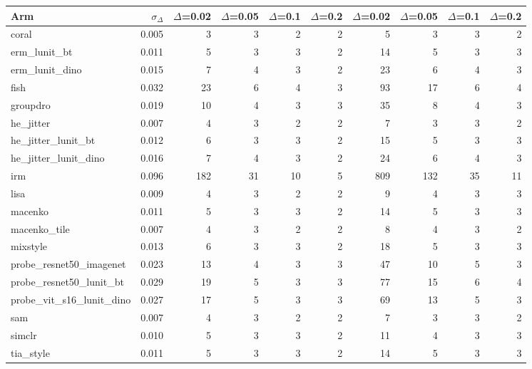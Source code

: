\begin{tabular}{lrrrrrrrrr}
\toprule
Arm & $\sigma_\Delta$ & $\Delta$=0.02 & $\Delta$=0.05 & $\Delta$=0.1 & $\Delta$=0.2 & $\Delta$=0.02 & $\Delta$=0.05 & $\Delta$=0.1 & $\Delta$=0.2 \\
\midrule
coral & 0.005 & 3 & 3 & 2 & 2 & 5 & 3 & 3 & 2 \\
erm\_lunit\_bt & 0.011 & 5 & 3 & 3 & 2 & 14 & 5 & 3 & 3 \\
erm\_lunit\_dino & 0.015 & 7 & 4 & 3 & 2 & 23 & 6 & 4 & 3 \\
fish & 0.032 & 23 & 6 & 4 & 3 & 93 & 17 & 6 & 4 \\
groupdro & 0.019 & 10 & 4 & 3 & 3 & 35 & 8 & 4 & 3 \\
he\_jitter & 0.007 & 4 & 3 & 2 & 2 & 7 & 3 & 3 & 2 \\
he\_jitter\_lunit\_bt & 0.012 & 6 & 3 & 3 & 2 & 15 & 5 & 3 & 3 \\
he\_jitter\_lunit\_dino & 0.016 & 7 & 4 & 3 & 2 & 24 & 6 & 4 & 3 \\
irm & 0.096 & 182 & 31 & 10 & 5 & 809 & 132 & 35 & 11 \\
lisa & 0.009 & 4 & 3 & 2 & 2 & 9 & 4 & 3 & 3 \\
macenko & 0.011 & 5 & 3 & 3 & 2 & 14 & 5 & 3 & 3 \\
macenko\_tile & 0.007 & 4 & 3 & 2 & 2 & 8 & 4 & 3 & 2 \\
mixstyle & 0.013 & 6 & 3 & 3 & 2 & 18 & 5 & 3 & 3 \\
probe\_resnet50\_imagenet & 0.023 & 13 & 4 & 3 & 3 & 47 & 10 & 5 & 3 \\
probe\_resnet50\_lunit\_bt & 0.029 & 19 & 5 & 3 & 3 & 77 & 15 & 6 & 4 \\
probe\_vit\_s16\_lunit\_dino & 0.027 & 17 & 5 & 3 & 3 & 69 & 13 & 5 & 3 \\
sam & 0.007 & 4 & 3 & 2 & 2 & 7 & 3 & 3 & 2 \\
simclr & 0.010 & 5 & 3 & 3 & 2 & 11 & 4 & 3 & 3 \\
tia\_style & 0.011 & 5 & 3 & 3 & 2 & 14 & 5 & 3 & 3 \\
\bottomrule
\end{tabular}
